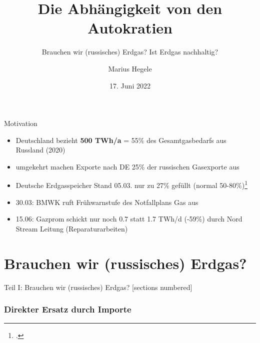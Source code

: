 \documentclass[10pt]{beamer}
\title{Die Abhängigkeit von den Autokratien}
\subtitle{Brauchen wir (russisches) Erdgas? Ist Erdgas nachhaltig?}
\date{17. Juni 2022}
\author{Marius Hegele}
\institute{Technik und Fortschritt im Anthropozän, SoSe 2022, ZAK/KIT}
\begin{document}
\maketitle

\begin{frame}{Motivation}

  \addtolength{\leftmargini}{\labelsep}

  \small{
  \begin{itemize}
    \item Deutschland bezieht \textbf{500 TWh/a} = 55\% des Gesamtgasbedarfs aus Russland (2020)
    \item umgekehrt machen Exporte nach DE 25\% der russischen Gasexporte aus
    \item Deutsche Erdgasspeicher Stand 05.03. nur zu 27\% gefüllt (normal 50-80\%)\footcite{leo}
    \item 30.03: BMWK ruft Frühwarnstufe des Notfallplans Gas aus
    \item 15.06: Gazprom schickt nur noch 0.7 statt 1.7 TWh/d (-59\%) durch Nord Stream Leitung (Reparaturarbeiten)
  \end{itemize}
  }
\end{frame}

\part{Brauchen wir (russisches) Erdgas?}
\frame{\partpage}

\begin{frame}{Teil I: Brauchen wir (russisches) Erdgas?}
  [sections numbered]
  \tableofcontents[hideallsubsections,part=1]
\end{frame}


\section{Direkter Ersatz durch Importe}
\end{document}
